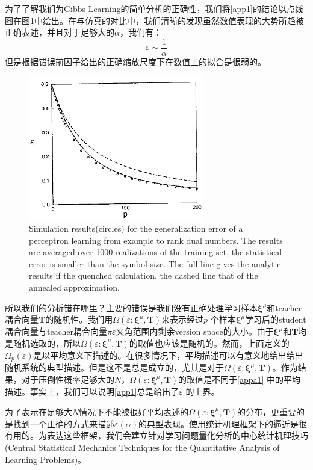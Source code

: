 \documentclass[11pt,fleqn, UTF8]{ctexbook} %
\begin{document}
\begin{subappendices}
为了了解我们为Gibbs Learning的简单分析的正确性，我们将\ref{app1}的结论以点线图在图\ref{fig:app4}中绘出。在与仿真的对比中，我们清晰的发现虽然数值表现的大势所趋被正确表述，并且对于足够大的$\alpha$，我们有：
\begin{equation*}
  \varepsilon\sim\frac{1}{\alpha}
\end{equation*}
但是根据错误前因子给出的正确缩放尺度下在数值上的拟合是很弱的。

\begin{figure}[t]
 \centering
 \includegraphics{pics/app4.png}
 \caption{Simulation results(circles) for the generalization error of a perceptron learning from example to rank dual numbers. The results are averaged over 1000 realizations of the training set, the statistical error is smaller than the symbol size. The full line gives the analytic results if the quenched calculation, the dashed line that of the annealed approximation.}
 \label{fig:app4}
\end{figure}

所以我们的分析错在哪里？主要的错误是我们没有正确处理学习样本$\boldsymbol{\xi}^{\mu}$和teacher耦合向量$\boldsymbol{T}$的随机性。我们用$\Omega(\varepsilon:\boldsymbol{\xi}^{\mu},\boldsymbol{T})$来表示经过$p$ 个样本$\boldsymbol{\xi}^{\mu}$学习后的student耦合向量与teacher耦合向量$\pi\varepsilon$夹角范围内剩余version space的大小。由于$\boldsymbol{\xi}^{\mu}$和$\boldsymbol{T}$均是随机选取的，所以$\Omega(\varepsilon:\boldsymbol{\xi}^{\mu},\boldsymbol{T})$的取值也应该是随机的。然而，上面定义的$\Omega_p(\varepsilon)$是以平均意义下描述的。在很多情况下，平均描述可以有意义地给出给出随机系统的典型描述。但是这不是总是成立的，尤其是对于$\Omega(\varepsilon:\boldsymbol{\xi}^{\mu},\boldsymbol{T})$。作为结果，对于压倒性概率足够大的$N$，$\Omega(\varepsilon:\boldsymbol{\xi}^{\mu},\boldsymbol{T})$的取值是不同于\ref{appa1} 中的平均描述。事实上，我们可以说明\ref{app1}总是给出了$\varepsilon$ 的上界。

为了表示在足够大$N$情况下不能被很好平均表述的$\Omega(\varepsilon:\boldsymbol{\xi}^{\mu},\boldsymbol{T})$的分布，更重要的是找到一个正确的方式来描述$\varepsilon(\alpha)$的典型表现。使用统计机理框架下的逼近是很有用的。为表达这些框架，我们会建立针对学习问题量化分析的中心统计机理技巧(Central Statistical Mechanics Techniques for the Quantitative Analysis of Learning Problems)。

\end{subappendices}
\end{document}
